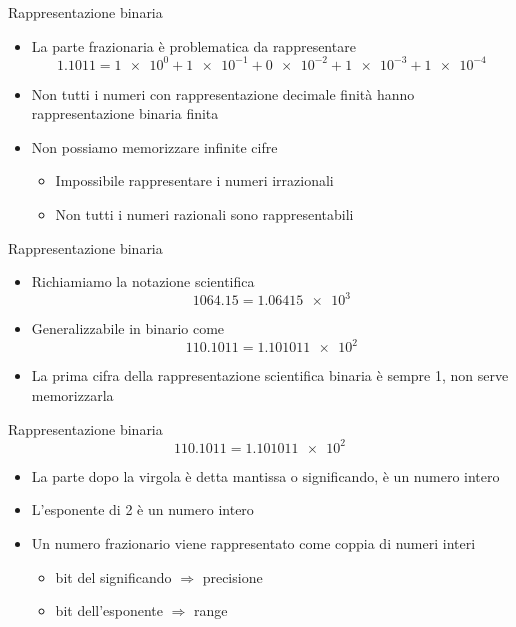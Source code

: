 \documentclass[xcolor=dvipsnames,handout]{beamer}
\begin{document}
\begin{frame}{Rappresentazione binaria}
  \vfill
  \begin{itemize}
    \item La parte frazionaria è problematica da rappresentare
    \[\num[group-digits = false]{1.1011} = \num[exponent-base = 2]{1e0} + \num[exponent-base = 2]{1e-1}
    + \num[exponent-base = 2]{0e-2} + \num[exponent-base = 2]{1e-3} + \num[exponent-base = 2]{1e-4}\]
    \item Non tutti i numeri con rappresentazione decimale finità hanno rappresentazione
    binaria finita
    \vfill
    \item Non possiamo memorizzare infinite cifre
    \begin{itemize}
      \item Impossibile rappresentare i numeri irrazionali
      \item Non tutti i numeri razionali sono rappresentabili
    \end{itemize}
  \end{itemize}
  \vfill
\end{frame}

\begin{frame}{Rappresentazione binaria}
  \vfill
  \begin{itemize}
    \item Richiamiamo la notazione scientifica
    \[\num{1064.15} = \num{1.06415e3}\]
    \item Generalizzabile in binario come
    \[\num[group-digits = false]{110.1011} = \num[exponent-base = 2,group-digits = false]{1.101011e2}\]
    \item La \alert{prima} cifra della rappresentazione scientifica binaria è \alert{sempre 1}, non serve memorizzarla
  \end{itemize}
  \vfill
\end{frame}

\begin{frame}{Rappresentazione binaria}
  \vfill
    \[\num[group-digits = false]{110.1011} = \num[exponent-base = 2,group-digits = false]{1.101011e2}\]
  \begin{itemize}
    \item La parte dopo la virgola è detta \alert{mantissa} o \alert{significando}, è un numero intero
    \vfill
    \item L'\alert{esponente} di 2 è un numero intero
    \vfill
    \item Un numero frazionario viene rappresentato come coppia di numeri interi
    \begin{itemize}
      \item bit del significando \(\Rightarrow\) precisione
      \item bit dell'esponente \(\Rightarrow\) range
    \end{itemize}
  \end{itemize}
  \vfill
\end{frame}
\end{document}
